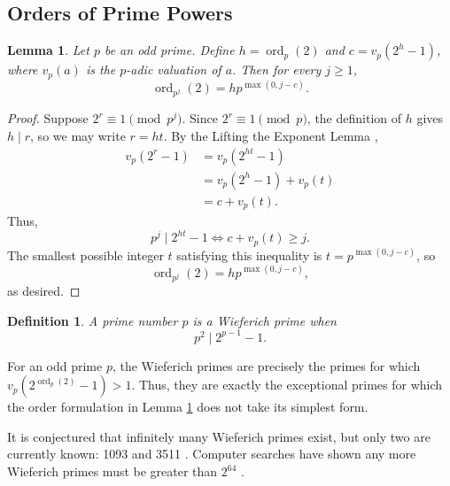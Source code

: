 \documentclass[a4paper]{article}
\newtheorem{lemma}[theorem]{Lemma}
\newtheorem{definition}[theorem]{Definition}
\newcommand{\ord}[2][]{\operatorname{ord}_{#1}\!\left( #2 \right)}
\begin{document}
	\subsection{Orders of Prime Powers}
	\begin{lemma}\label{ordpj2}
		Let $p$ be an odd prime.
		Define $h = \ord[p]{2}$ and $c = v_p(2^h - 1)$, where
		$v_p(a)$ is the $p$-adic valuation of $a$.
		Then for every $j \geq 1$,
		\begin{equation*}
			\ord[p^j]{2} = h p^{\max{(0, j - c)}}.
		\end{equation*}
	\end{lemma}
	\begin{proof}
		Suppose $2^r \equiv 1 \pmod{p^j}$.
		Since $2^r \equiv 1 \pmod p$, the definition of $h$ gives $h \mid r$, so we may write $r = ht$.
		By the Lifting the Exponent Lemma \cite[Chapter 2 Section 2.7]{ireland_rosen_1990},
		\begin{align*}
			v_p(2^r - 1) &= v_p(2^{ht} - 1) \\
			&= v_p(2^h - 1) + v_p(t) \\
			&= c + v_p(t).
		\end{align*}
		Thus,
		\begin{equation*}
			p^j \mid 2^{ht} - 1 \iff c + v_p(t) \geq j.
		\end{equation*}
		The smallest possible integer $t$ satisfying this inequality is $t = p^{\max{(0, j-c)}}$, so
		\begin{equation*}
			\ord[p^j]{2} = h p^{\max{(0, j-c)}},
		\end{equation*}
		as desired.
	\end{proof}
	
	\begin{definition}
		A prime number $p$ is a \textit{Wieferich prime} when
		\begin{equation*}
			p^2 \mid 2^{p-1} - 1.
		\end{equation*}
	\end{definition}
	For an odd prime $p$, the Wieferich primes are precisely the primes for which $v_p(2^{\ord[p]{2}}-1) > 1$.
	Thus, they are exactly the exceptional primes for which the order formulation in Lemma \ref{ordpj2} does not take its simplest form.
	
	It is conjectured that infinitely many Wieferich primes exist, but only two are currently known: 1093 and 3511 \cite{CrandallSearch}.
	Computer searches have shown any more Wieferich primes must be greater than $2^{64}$ \cite{PrimeGridWieferich}.
\end{document}
